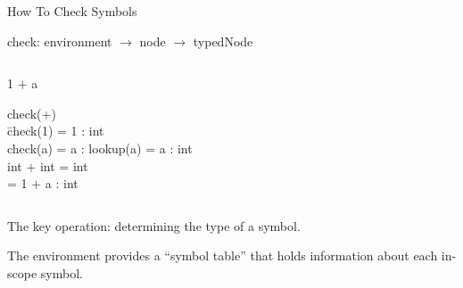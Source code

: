 \documentclass{plt}
\begin{document}
\begin{frame}[fragile]{How To Check Symbols}

check: environment $\rightarrow$ node $\rightarrow$ typedNode

\begin{columns}
  \begin{column}{0.45\textwidth}
\begin{center}
\begin{C}
1 + a
\end{C}

\end{center}

\begin{tabbing}
check(+) \\
\hspace{1pc} \= check(1) = 1 : int \\
\>  check(a) = a : lookup(a) = a : int \\
\>  int + int = int \\
\>  = 1 $+$ a : int \\
\end{tabbing}
  \end{column}
\end{columns}

The key operation: determining the type of a symbol.

The environment provides a ``symbol table'' that holds information
about each in-scope symbol.

\end{frame}
\end{document}
